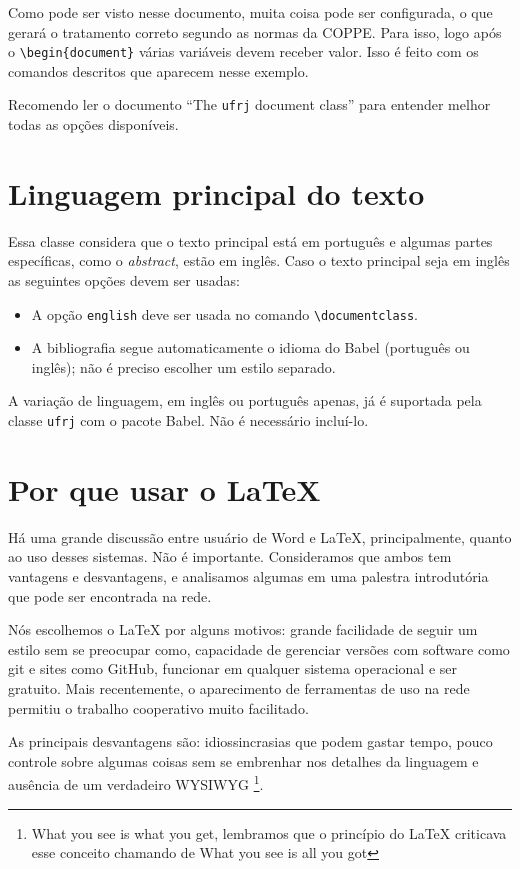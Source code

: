 \documentclass[dsc,setavermelha]{ufrj}
\theoremstyle{plain}
\theoremstyle{definition}
\theoremstyle{remark}
\begin{document}
   Como pode ser visto nesse documento, muita coisa pode ser configurada, o que gerará o tratamento correto segundo as normas da COPPE. Para isso, logo após o \verb|\begin{document}| várias variáveis devem receber valor. Isso é feito com os comandos descritos que aparecem nesse exemplo.

   Recomendo ler o documento ``The \verb*|ufrj| document class'' para entender melhor todas as opções disponíveis.

\section{Linguagem principal do texto}

  Essa classe considera que o texto principal está em português e algumas partes específicas, como o \textit{abstract}, estão em inglês. Caso o texto principal seja em inglês as seguintes opções devem ser usadas:
 \begin{itemize}
 \item A opção \verb|english| deve ser usada no comando \verb|\documentclass|.
 \item A bibliografia segue automaticamente o idioma do Babel (português ou inglês); não é preciso escolher um estilo separado.
 \end{itemize}

  A variação de linguagem, em inglês ou português apenas, já é suportada pela classe \verb|ufrj| com o pacote Babel. Não é necessário incluí-lo.

\section{Por que usar o \LaTeX}

  Há uma grande discussão entre usuário de Word e \LaTeX, principalmente, quanto ao uso desses sistemas. Não é importante. Consideramos que ambos tem vantagens e desvantagens, e analisamos algumas em uma palestra introdutória que pode ser encontrada na rede.

  Nós escolhemos o \LaTeX{} por alguns motivos: grande facilidade de seguir um estilo sem se preocupar como, capacidade de gerenciar versões com software como git e sites como GitHub, funcionar em qualquer sistema operacional e  ser gratuito. Mais recentemente, o aparecimento de ferramentas de uso na rede permitiu o trabalho cooperativo muito facilitado.

  As principais desvantagens são: idiossincrasias que podem gastar tempo, pouco controle sobre algumas coisas sem se embrenhar nos detalhes da linguagem e ausência de um verdadeiro WYSIWYG \footnote{What you see is what you get, lembramos que o princípio do \LaTeX{} criticava esse conceito chamando de What you see is all you got}.
\end{document}
